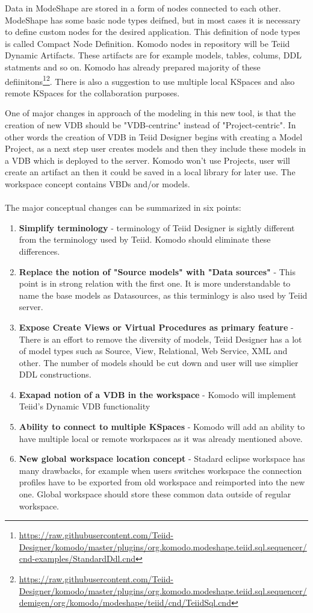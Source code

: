 \documentclass[12pt,oneside]{fithesis2}
\begin{document}
\par Data in ModeShape are stored in a form of nodes connected to each other.  ModeShape has some basic node types deifned, but in most cases it is necessary to define custom nodes for the desired application. This definition of node types is called Compact Node Definition. Komodo nodes in repository will be Teiid Dynamic Artifacts. These artifacts are for example models, tables, colums, DDL statments and so on. Komodo has already prepared majority of these defiinitons\footnote{\url{https://raw.githubusercontent.com/Teiid-Designer/komodo/master/plugins/org.komodo.modeshape.teiid.sql.sequencer/cnd-examples/StandardDdl.cnd}}\footnote{\url{https://raw.githubusercontent.com/Teiid-Designer/komodo/master/plugins/org.komodo.modeshape.teiid.sql.sequencer/demigen/org/komodo/modeshape/teiid/cnd/TeiidSql.cnd}}. There is also a suggestion to use multiple local KSpaces and also remote KSpaces for the collaboration purposes. 
\par One of major changes in approach of the modeling in this new tool, is that the creation of new VDB should be "VDB-centrinc" instead of "Project-centric". In other words the creation of VDB in Teiid Designer begins with creating a Model Project, as a next step user creates models and then they include these models in a VDB which is deployed to the server. Komodo won't use Projects, user will create an artifact an then it could be saved in a local library for later use. The workspace concept contains VBDs and/or models.\\ \\
The major conceptual changes can be summarized in six points:
\begin{enumerate}
\item \textbf{Simplify terminology }- terminology of Teiid Designer is sightly different from the terminology used by Teiid. Komodo should eliminate these differences.
\item \textbf{Replace the notion of "Source models" with "Data sources" }- This point is in strong relation with the first one. It is more understandable to name the base models as Datasources, as this terminlogy is also used by Teiid server.
\item \textbf{Expose Create Views or Virtual Procedures as primary feature} - There is an effort to remove the diversity of models, Teiid Designer has a lot of model types such as Source, View, Relational, Web Service, XML and other. The number of models should be cut down and user will use simplier DDL constructions.
\item \textbf{Exapad notion of a VDB in the workspace} - Komodo will implement Teiid's Dynamic VDB functionality
\item \textbf{Ability to connect to multiple KSpaces} - Komodo will add an ability to have multiple local or remote workspaces as it was already mentioned above.
\item \textbf{New global workspace location concept} - Stadard eclipse workspace has many drawbacks, for example when users switches workspace the connection profiles have to be exported from old workspace and reimported into the new one. Global workspace should store these common data outside of regular workspace.
\end{enumerate}
\end{document}
